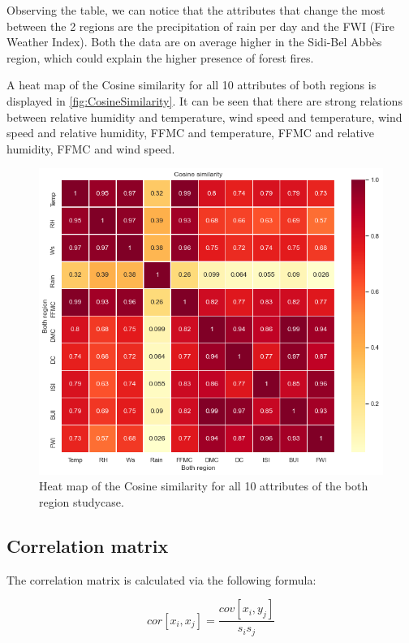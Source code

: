 \documentclass[10pt]{article}
\numberwithin{equation}{section}
\numberwithin{figure}{section}
\numberwithin{table}{section}
\begin{document}
Observing the table, we can notice that the attributes that change the most between the 2 regions are the precipitation of rain per day and the FWI (Fire Weather Index). Both the data are on average higher in the Sidi-Bel Abbès region, which could explain the higher presence of forest fires.


A heat map of the Cosine similarity for all 10 attributes of both regions is displayed in \autoref{fig:CosineSimilarity}. It can be seen that there are strong relations between relative humidity and temperature, wind speed and temperature, wind speed and relative humidity, FFMC and temperature, FFMC and relative humidity, FFMC and wind speed.
\begin{figure} [H]
    \centering
    \includegraphics[scale=0.50]{Figures/CosineSimilarity.png}
    \caption{Heat map of the Cosine similarity for all 10 attributes of the both region studycase.}
    \label{fig:CosineSimilarity}
\end{figure}

\subsection{Correlation matrix}
\label{correlationStudy}

The correlation matrix is calculated via the following formula:

\begin{equation}
    cor[x_i,x_j]=\frac{cov[x_i,y_j]}{s_is_j}
\end{equation}
\end{document}
